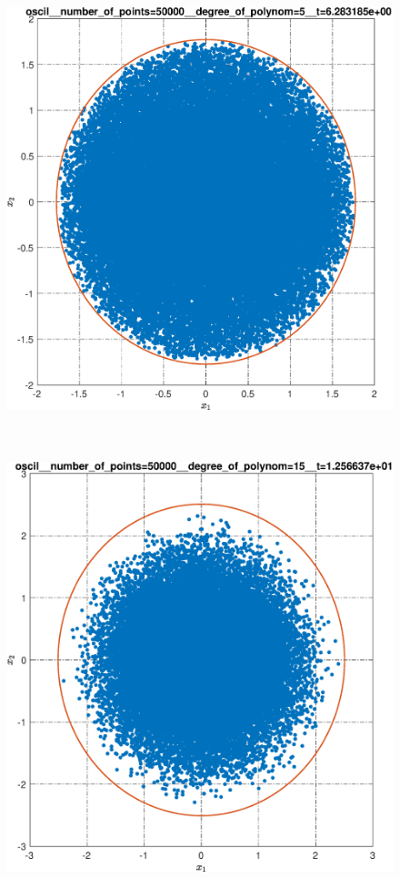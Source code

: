 \documentclass[../main.tex]{subfiles}
\begin{document}
\begin{figure}[ht!]
\begin{minipage}[b]{.3\linewidth}
 		\includegraphics[width=\linewidth]{images/oscil__number_of_points=50000__degree_of_polynom=5__t=2pi.eps}
 		\label{fig:ap:oscilN5104k5T2pi}
 	\end{minipage} 
 	\hfill
 	\begin{minipage}[b]{.3\linewidth} 
 		\small
 		\centering
 		\includegraphics[width=\linewidth]{images/oscil__number_of_points=50000__degree_of_polynom=15__t=4pi.eps}

\end{minipage}
\end{figure}
\end{document}
